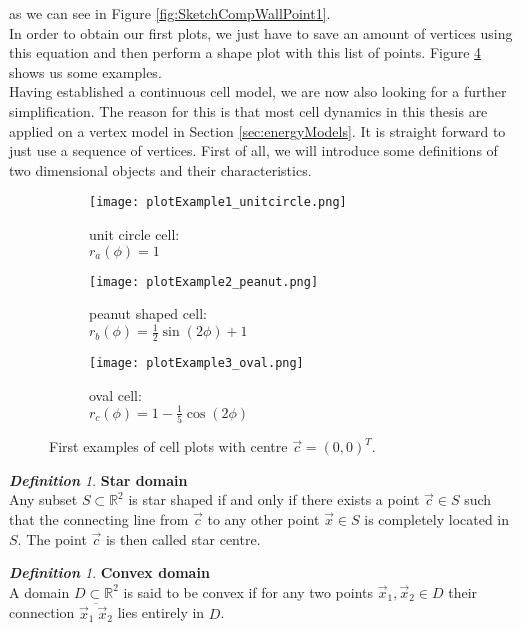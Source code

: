 \documentclass[a4paper,12pt,leqno]{article}
\theoremstyle{plain}
\theoremstyle{remark}
\newtheorem{definition}[theorem]{\bf Definition}
\newcommand{\R}{\mathbb{R}}
\begin{document}
as we can see in Figure \ref{fig:SketchCompWallPoint1}.\\
In order to obtain our first plots, we just have to save an amount of vertices using this equation and then perform a shape plot with this list of points. Figure \ref{fig:plotExamples} shows us some examples. \\
Having established a continuous cell model, we are now also looking for a further simplification. The reason for this is that most cell dynamics in this thesis are applied on a vertex model in Section \ref{sec:energyModels}. It is straight forward to just use a sequence of vertices. First of all, we will introduce some definitions of two dimensional objects and their characteristics.\\
\begin{figure}[t!]
	\centering
	\begin{subfigure}{0.3\textwidth}
		\texttt{[image: plotExample1\_unitcircle.png]}
		\caption{unit circle cell:  \\ $r_{a}(\phi) = 1$}
		\label{fig:unitcircle}
	\end{subfigure}
	\hfill
	\begin{subfigure}{0.3\textwidth}
		\texttt{[image: plotExample2\_peanut.png]}
		\caption{peanut shaped cell: \\ $r_{b}(\phi) = \frac{1}{2}\sin(2\phi) + 1$}
		\label{fig:peanut}
	\end{subfigure}
	\hfill
	\begin{subfigure}{0.3\textwidth}
		\texttt{[image: plotExample3\_oval.png]}
		\caption{oval cell: \\  $r_{c}(\phi) = 1 - \frac{1}{5}\cos(2\phi)$}
		\label{fig:oval}
	\end{subfigure}
	\caption{First examples of cell plots with centre $\vec{c} = (0,0)^T$.}
	\label{fig:plotExamples}
\end{figure}
\begin{definition} \textbf{Star domain}\\
	Any subset $S \subset \R^2 $ is star shaped if and only if there exists a point $\vec{c} \in S$ such that the connecting line from $\vec{c}$ to any other point $\vec{x} \in S$ is completely located in $S$. The point $\vec{c}$ is then called star centre. \\
\end{definition}
\begin{definition} \textbf{Convex domain}\\
	A domain $D \subset \R^2$ is said to be convex if for any two points $\vec{x}_1, \vec{x}_2 \in D$ their connection $\overline{\vec{x}_1 \: \vec{x}_2}$ lies entirely in $D$. \\ 
\end{definition}
\end{document}
